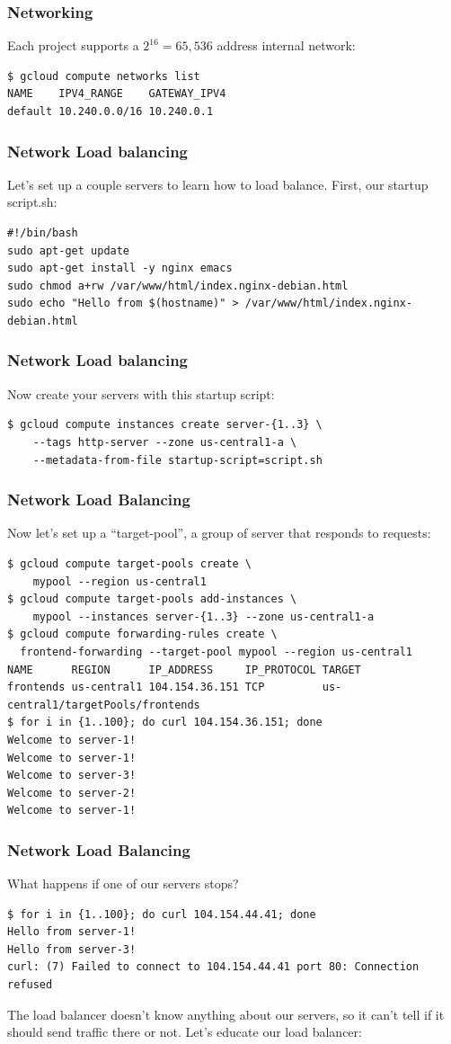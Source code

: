 \documentclass[9pt]{beamer}
\begin{document}
\begin{frame}[fragile]
  \frametitle{Networking}
  Each project supports a $2^{16} = 65,536$ address internal network:
  \begin{verbatim}
$ gcloud compute networks list
NAME    IPV4_RANGE    GATEWAY_IPV4
default 10.240.0.0/16 10.240.0.1    
  \end{verbatim}
\end{frame}

\begin{frame}[fragile]
\frametitle{Network Load balancing}
Let's set up a couple servers to learn how to load balance. First, our startup script.sh:
\begin{verbatim}
#!/bin/bash
sudo apt-get update
sudo apt-get install -y nginx emacs
sudo chmod a+rw /var/www/html/index.nginx-debian.html 
sudo echo "Hello from $(hostname)" > /var/www/html/index.nginx-debian.html
\end{verbatim}  
\end{frame}

\begin{frame}[fragile]
\frametitle{Network Load balancing}
Now create your servers with this startup script:
 \begin{verbatim}
$ gcloud compute instances create server-{1..3} \
    --tags http-server --zone us-central1-a \
    --metadata-from-file startup-script=script.sh
  \end{verbatim}
\end{frame}

\begin{frame}[fragile]
\frametitle{Network Load Balancing}
Now let's set up a ``target-pool'', a group of server that responds to requests:
\begin{verbatim}
$ gcloud compute target-pools create \
    mypool --region us-central1
$ gcloud compute target-pools add-instances \ 
    mypool --instances server-{1..3} --zone us-central1-a
$ gcloud compute forwarding-rules create \
  frontend-forwarding --target-pool mypool --region us-central1
NAME      REGION      IP_ADDRESS     IP_PROTOCOL TARGET
frontends us-central1 104.154.36.151 TCP         us-central1/targetPools/frontends
$ for i in {1..100}; do curl 104.154.36.151; done
Welcome to server-1!
Welcome to server-1!
Welcome to server-3!
Welcome to server-2!
Welcome to server-1!
\end{verbatim}
\end{frame}

\begin{frame}[fragile]
  \frametitle{Network Load Balancing}
  What happens if one of our servers stops?
\begin{verbatim}
$ for i in {1..100}; do curl 104.154.44.41; done
Hello from server-1!
Hello from server-3!
curl: (7) Failed to connect to 104.154.44.41 port 80: Connection refused
\end{verbatim}
The load balancer doesn't know anything about our servers, so it can't tell if it should send traffic there or not. Let's educate our load balancer:
\end{frame}
\end{document}
